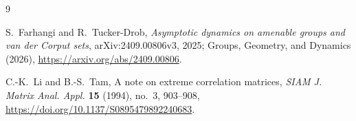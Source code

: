 \documentclass[11pt]{article}
\begin{document}
{\footnotesize
\begin{thebibliography}{9}
\setlength{\itemsep}{0pt}

S.~Farhangi and R.~Tucker-Drob,
\newblock \emph{Asymptotic dynamics on amenable groups and van der Corput sets},
\newblock arXiv:2409.00806v3, 2025; Groups, Geometry, and Dynamics (2026),
\newblock \url{https://arxiv.org/abs/2409.00806}.

C.-K.~Li and B.-S.~Tam,
\newblock A note on extreme correlation matrices,
\newblock \emph{SIAM J. Matrix Anal. Appl.} \textbf{15} (1994), no.~3,
903--908,
\newblock \url{https://doi.org/10.1137/S0895479892240683}.

\end{thebibliography}
}
\end{document}
